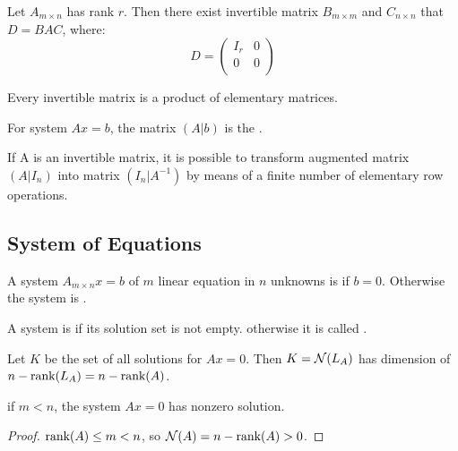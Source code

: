 \begin{theorem}
    Let $A_{m \times n}$ has rank $r$. Then there exist invertible matrix $B_{m \times m}$ and $C_{n \times n}$ that $D=BAC$, where:
    \begin{equation*}
        D = \begin{pmatrix}
			I_r & 0 \\
			0 & 0 \\
		\end{pmatrix}
    \end{equation*}
\end{theorem}


\begin{theorem}
    Every invertible matrix is a product of elementary matrices.
\end{theorem}

\begin{definition}
	For system $Ax=b$, the matrix $(A|b)$ is the .
\end{definition}


\begin{theorem}
    If A is an invertible matrix, it is possible to transform augmented matrix $(A|I_n)$ into matrix $(I_n|A^{-1})$ by means of a finite number of elementary row operations.
\end{theorem}

\subsection{System of Equations}

\begin{definition}
	A system $A_{m \times n} x=b$ of $m$ linear equation in $n$ unknowns is  if $b=0$. Otherwise the system is .
\end{definition}

\begin{definition}
	A system is  if its solution set is not empty. otherwise it is called .
\end{definition}

\begin{theorem}
	Let $K$ be the set of all solutions for $Ax=0$. Then $K=\mathcal{N}(L_A)$ has dimension of $n- \displaystyle \text{rank}( L_A )=n-\displaystyle \text{rank}( A )$.
\end{theorem}

\begin{theorem}
	if $m < n$, the system $Ax=0$ has nonzero solution.
\end{theorem}
\begin{proof}
    $\displaystyle \text{rank}( A ) \leq m < n$, so $\mathcal{N}(A) = n - \displaystyle \text{rank}( A ) > 0$.
\end{proof}

